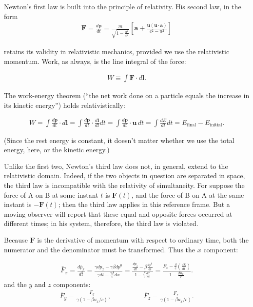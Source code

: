 \documentclass[12pt]{book}
\newcommand{\bm}[1]{\boldsymbol{#1}}
\begin{document}
        Newton’s first law is built into the principle of relativity. His second law, in the form
        \begin{align}
        \bm{F} = \frac{d\bm{p}}{dt} =\frac{m}{\sqrt{1 - \frac{u^2}{c^2}}} \left[ \mathbf{a} + \frac{\mathbf{u}(\mathbf{u} \cdot \mathbf{a})}{c^2 - u^2} \right]
        \end{align}
        
        retains its validity in relativistic mechanics, provided we use the relativistic momentum.
        Work, as always, is the line integral of the force:
        
        \begin{align}
        W \equiv \int \bm{F} \cdot d\bm{l}.
        \end{align}
        
        The work-energy theorem (“the net work done on a particle equals the increase in its kinetic energy”) holds relativistically:
        
        \begin{align}
        W = \int \frac{d\bm{p}}{dt} \cdot d\bm{l} = \int \frac{d\bm{p}}{dt} \cdot \frac{d\bm{l}}{dt} dt = \int \frac{d\bm{p}}{dt} \cdot \bm{u} \, dt= \int \frac{dE}{dt} dt = E_{\text{final}} - E_{\text{initial}}.
        \end{align}
        
        (Since the rest energy is constant, it doesn’t matter whether we use the total energy, here, or the kinetic energy.)
        
        Unlike the first two, Newton’s third law does not, in general, extend to the relativistic domain. Indeed, if the two objects in question are separated in space, the third law is incompatible with the relativity of simultaneity. For suppose the force of A on B at some instant \(t\) is \(\bm{F}(t)\), and the force of B on A at the same instant is \(-\bm{F}(t)\); then the third law applies in this reference frame. But a moving observer will report that these equal and opposite forces occurred at different times; in his system, therefore, the third law is violated.
        
        Because \(\bm{F}\) is the derivative of momentum with respect to ordinary time, both the numerator and the denominator must be transformed. Thus the \(x\) component:
        
        \begin{align}
        \bar{F}_x = \frac{d \bar{p}_x}{d \bar{t}} = \frac{\gamma dp_x - \gamma\beta dp^0}{\gamma dt -  \frac{\gamma\beta}{c} dx} = \frac{\frac{dp_x}{dt} - \beta \frac{ dp^0}{dt}}{1 - \frac{\beta}{c}\frac{dx}{dt}} = \frac{F_x - \frac{\beta}{c}(\frac{dE}{dt})}{1 - \frac{\beta u_x}{c}}.
        \end{align}
        and the \(y\) and \(z\) components:
        \begin{align}
        \bar{F}_y = \frac{F_y}{\gamma (1 - \beta u_x/c)}, \hspace{2cm} \bar{F}_z = \frac{F_z}{\gamma (1 - \beta u_x/c)}. 
        \end{align}      
        
\end{document}
